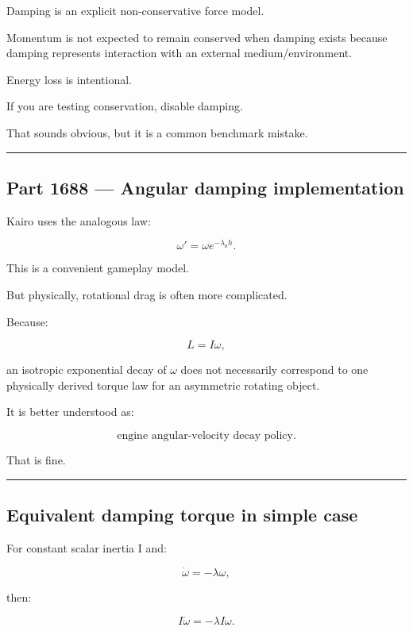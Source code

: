 Damping is an explicit non-conservative force model.

Momentum is not expected to remain conserved when damping exists because damping represents interaction with an external medium/environment.

Energy loss is intentional.

If you are testing conservation, disable damping.

That sounds obvious, but it is a common benchmark mistake.

\begin{center}\rule{0.5\linewidth}{0.5pt}\end{center}

\subsection{Part 1688 --- Angular damping implementation}\label{06-engine-ii-ch039-part-1688-angular-damping-implementation}

Kairo uses the analogous law:

\[
\boxed{
\omega'
=
\omega e^{-\lambda_ah}.
}
\]

This is a convenient gameplay model.

But physically, rotational drag is often more complicated.

Because:

\[
L=I\omega,
\]

an isotropic exponential decay of \(\omega\) does not necessarily correspond to one physically derived torque law for an asymmetric rotating object.

It is better understood as:

\[
\boxed{
\text{engine angular-velocity decay policy}.
}
\]

That is fine.

\begin{center}\rule{0.5\linewidth}{0.5pt}\end{center}

\subsection{Equivalent damping torque in simple case}\label{06-engine-ii-ch039-equivalent-damping-torque-in-simple-case}

For constant scalar inertia I and:

\[
\dot\omega=-\lambda\omega,
\]

then:

\[
I\dot\omega
=
-\lambda I\omega.
\]

